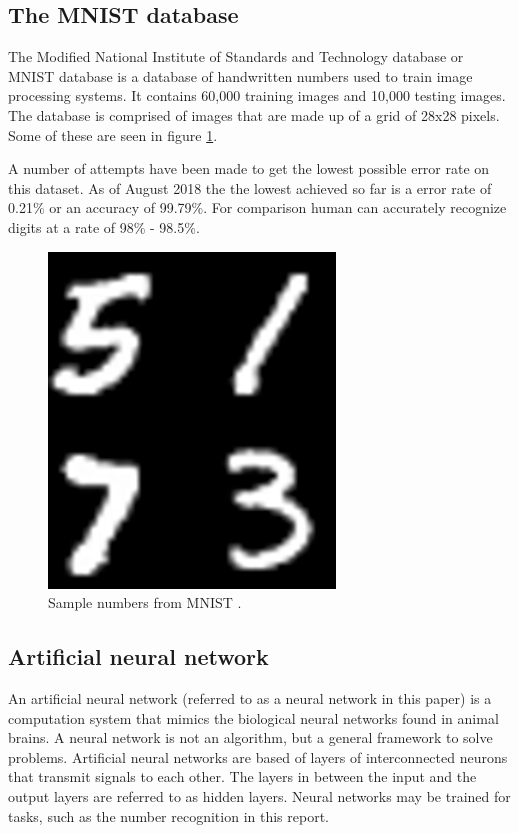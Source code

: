\documentclass[12pt]{article}
\begin{document}
	\subsection{The MNIST database}
	The Modified National Institute of Standards and Technology database or MNIST database\cite{mnistDATABASE} is a database of handwritten numbers used to train image processing systems. It contains 60,000 training images and 10,000 testing images. The database is comprised of images that are made up of a grid of 28x28 pixels. Some of these are seen in figure \ref{fig:mathworksmnistneuralnetfinal}. \par 
	
	A number of attempts have been made to get the lowest possible error rate on this dataset. As of August 2018 the  the lowest achieved so far is a error rate of 0.21\% or an accuracy of 99.79\%. For comparison human can accurately recognize digits at a rate of 98\% - 98.5\%\cite{humanPerf}. 
	
	\begin{figure}[H]
		\centering
		\includegraphics[width=0.25\linewidth]{mathworks_mnist_neuralnetFinal_v2}
		\caption{Sample numbers from MNIST \cite{mnistMATLAB2}.}
		\label{fig:mathworksmnistneuralnetfinal}
	\end{figure}
	
	\subsection{Artificial neural network}
	An artificial neural network (referred to as a neural network in this paper) is a computation system that mimics the biological neural networks found in animal brains. A neural network is not an algorithm, but a general framework to solve problems. Artificial neural networks are based of layers of interconnected neurons that transmit signals to each other. The layers in between the input and the output layers are referred to as hidden layers. Neural networks may be trained for tasks, such as the number recognition in this report. 
	
\end{document}
